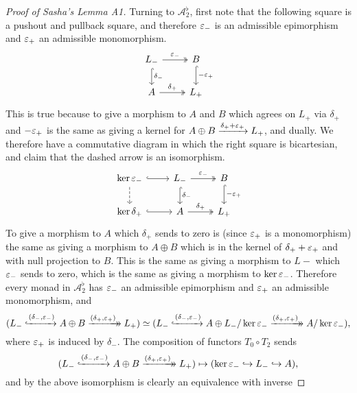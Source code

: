 \documentclass[deligne.tex]{subfiles}
\begin{document}
\begin{proof}[Proof of Sasha's Lemma A1]
Turning to $\mathcal A^\flat_2$, first note that the following square is a
pushout and pullback square, and therefore $\varepsilon_-$ is an admissible
epimorphism and $\varepsilon_+$ an admissible monomorphism.
\begin{equation*}\begin{tikzcd}
	L_-\arrow[r,twoheadrightarrow,"\vep_-"]\arrow[d,hook,"\delta_-"]
	&B\arrow[d,hook,"-\vep_+"] \\
	A\arrow[r,twoheadrightarrow,"\delta_+"]&L_+
\end{tikzcd}\end{equation*}
This is true because to give a morphism to $A$ and $B$ which agrees on
$L_+$ via $\delta_+$ and $-\varepsilon_+$ is the same as giving a kernel for 
$A\oplus B\xrightarrow{\delta_++\varepsilon_+}L_+$, and dually. We therefore have a
commutative diagram in which the right square is bicartesian, and claim that
the dashed arrow is an isomorphism.
\begin{equation*}\begin{tikzcd}
	\ker\vep_-\arrow[r,hook]\arrow[d,dashed]
	&L_-\arrow[r,twoheadrightarrow,"\vep_-"] \arrow[d,hook,"\delta_-"]
	&B\arrow[d,hook,"-\vep_+"] \\
	\ker \delta_+\arrow[r,hook]&A\arrow[r,twoheadrightarrow,"\delta_+"]&L_+
\end{tikzcd}\end{equation*}
To give a morphism to $A$ which $\delta_+$ sends to zero is (since $\varepsilon_+$
is a monomorphism) the same as giving a morphism to $A\oplus B$ which is in
the kernel of $\delta_++\varepsilon_+$ and with null projection to $B$.
This is the same as giving a morphism to $L-$ which $\varepsilon_-$ sends to zero,
which is the same as giving a morphism to $\ker\varepsilon_-$. Therefore every 
monad in $\mathcal A^\flat_2$ has $\varepsilon_-$ an admissible epimorphism and
$\varepsilon_+$ an admissible monomorphism, and
\begin{equation*}
	(L_-\xhookrightarrow{(\delta_-,\varepsilon_-)}
	A\oplus B\xrightarrow[]{(\delta_+,\varepsilon_+)}\mathrel{\mkern-14mu}\rightarrow L_+)
	\simeq
	(L_-\xhookrightarrow{(\delta_-,\varepsilon_-)}A\oplus
	L_-/\ker\varepsilon_-\xrightarrow[]{(\delta_+,\varepsilon_+)}\mathrel{\mkern-14mu}\rightarrow A/\ker\varepsilon_-),
\end{equation*}
where $\varepsilon_+$ is induced by $\delta_-$. The composition of functors
$T_0\circ T_2$ sends
\begin{equation*}
	(L_-\xhookrightarrow{(\delta_-,\varepsilon_-)}
	A\oplus B\xrightarrow[]{(\delta_+,\varepsilon_+)}\mathrel{\mkern-14mu}\rightarrow L_+)
	\mapsto
	(\ker\varepsilon_-\hookrightarrow L_-\hookrightarrow A),
\end{equation*}
and by the above isomorphism is clearly an equivalence with inverse

\end{proof}
\end{document}
